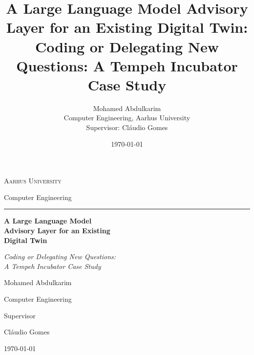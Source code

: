 \documentclass[12pt,a4paper]{article}
\title{A Large Language Model Advisory Layer for an Existing Digital Twin:\\
        \large Coding or Delegating New Questions: A Tempeh Incubator Case Study}
\author{Mohamed Abdulkarim \\ Computer Engineering, Aarhus University\\[0.6em]
        \normalsize Supervisor: Cláudio Gomes}
\date{\today}
\begin{document}

  \begin{titlepage}
      \thispagestyle{empty}

      \begin{center}
          \vspace*{\fill}

          {\large\scshape Aarhus University\par}
          \vspace{0.3cm}
          {\normalsize Computer Engineering\par}

          \vspace{1.8cm}

          \rule{0.22\textwidth}{1.2pt}

          \vspace{0.9cm}

          {\LARGE\bfseries
          A Large Language Model\\[0.25cm]
          Advisory Layer for an Existing\\[0.25cm]
          Digital Twin\par}

          \vspace{0.6cm}

          {\Large\itshape
          Coding or Delegating New Questions:\\[0.2cm]
          A Tempeh Incubator Case Study\par}

          \vspace{1.8cm}

          {\large Mohamed Abdulkarim\par}

          \vspace{0.4cm}

          {\normalsize
          Computer Engineering\par}

          \vspace{1.2cm}

          {\normalsize\textcolor{black!65}{Supervisor}\par}
          \vspace{0.15cm}
          {\large Cláudio Gomes\par}

          \vspace{1.5cm}

          {\normalsize\today\par}

          \vspace*{\fill}
      \end{center}
  \end{titlepage}
\end{document}
